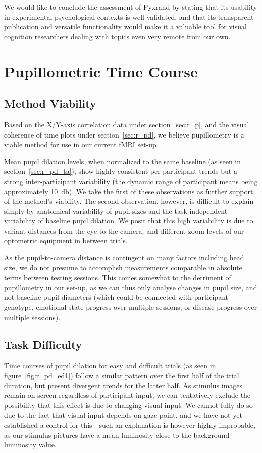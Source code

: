 	We would like to conclude the assessment of Pyxrand by stating that its usability in experimental psychological contexts is well-validated, and that its transparent publication and versatile functionality would make it a valuable tool for visual cognition researchers dealing with topics even very remote from our own.

    \section{Pupillometric Time Course}\label{sec:d_pd}
	\subsection{Method Viability}
	    Based on the X/Y-axis correlation data under section~\ref{sec:r_p}, and the visual coherence of time plots under section~\ref{sec:r_pd}, we believe pupillometry is a viable method for use in our current fMRI set-up.
	    
	    Mean pupil dilation levels, when normalized to the same baseline (as seen in section~\ref{sec:r_pd_ta}), show highly consistent per-participant trends but a strong inter-participant variability (the dynamic range of participant means being approximately \SI{10}{\decibel}).
	    We take the first of these observations as further support of the method's viability.
	    The second observation, however, is difficult to explain simply by anatomical variability of pupil sizes and the task-independent variability of baseline pupil dilation.
	    We posit that this high variability is due to variant distances from the eye to the camera, and different zoom levels of our optometric equipment in between trials.
	    
	    As the pupil-to-camera distance is contingent on many factors including head size, we do not presume to accomplish measurements comparable in absolute terms between testing sessions.
	    This comes somewhat to the detriment of pupillometry in our set-up, as we can thus only analyse changes in pupil size, and not baseline pupil diameters (which could be connected with participant genotype, emotional state progress over multiple sessions, or disease progress over multiple sessions).
	\subsection{Task Difficulty}\label{sec:d_pd_td}
	    Time courses of pupil dilation for easy and difficult trials (as seen in figure~\ref{fig:r_pd_ed1}) follow a similar pattern over the first half of the trial duration, but present divergent trends for the latter half.
	    As stimulus images remain on-screen regardless of participant input, we can tentatively exclude the possibility that this effect is due to changing visual input.
	    We cannot fully do so due to the fact that visual input depends on gaze point, and we have not yet established a control for this - such an explanation is however highly improbable, as our stimulus pictures have a mean luminosity close to the background luminosity value.
	    
